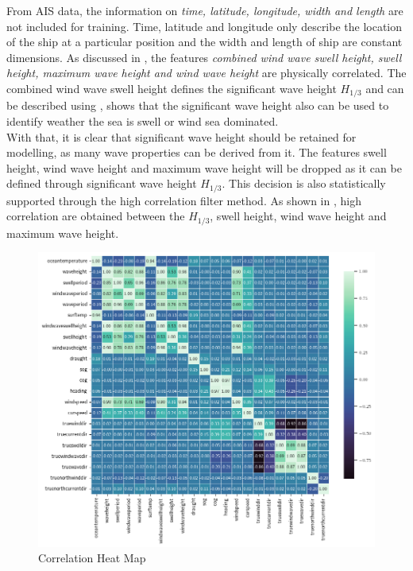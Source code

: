 From AIS data, the information on \emph{time, latitude, longitude, width and length} are not included for training. Time, latitude and longitude only describe the location of the ship at a particular position and the width and length of ship are constant dimensions. As discussed in , the features \emph{combined wind wave swell height, swell height, maximum wave height and wind wave height} are physically correlated. The combined wind wave swell height defines the significant wave height $H_{1/3}$ and can be described using ,  shows that the significant wave height also can be used to identify weather the sea is swell or wind sea dominated.\\

With that, it is clear that significant wave height should be retained for modelling, as many wave properties can be derived from it. The features swell height, wind wave height and maximum wave height will be dropped as it can be defined through significant wave height $H_{1/3}$. This decision is also statistically supported through the high correlation filter method. As shown in , high correlation are obtained between the $H_{1/3}$, swell height, wind wave height and maximum wave height.\\

\begin{figure}[ht]
    \centering
    \includegraphics[width=.9\linewidth,height=.9\textheight,keepaspectratio]{02_figures/heatmap_corr_ovr.png}
    \caption{Correlation Heat Map}
    \label{fig:heatmap_ovr}
\end{figure}

